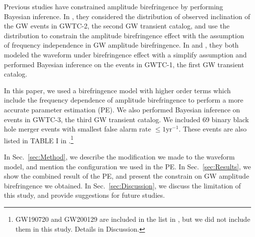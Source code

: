 \documentclass[aps,prd,twocolumn,superscriptaddress,preprintnumbers,floatfix,nofootinbib]{revtex4-2}
\begin{document}
Previous studies have constrained amplitude birefringence by performing Bayesian inference.
In \citet{Okounkova_2022}, they considered the distribution of observed inclination of the GW events in GWTC-2, the second GW transient catalog, and use the distribution to constrain the amplitude birefringence effect with the assumption of frequency independence in GW amplitude birefringence.
In \citet{Yamada_2020} and \citet{Wang_2021}, they both modeled the waveform under birefringence effect with a simplify assumption and performed Bayesian inference on the events in GWTC-1, the first GW transient catalog.

In this paper, we used a birefringence model with higher order terms which include the frequency dependence of amplitude birefringence to perform a more accurate parameter estimation (PE).
We also performed Bayesian inference on events in GWTC-3, the third GW transient catalog.
We included 69 binary black hole merger events with smallest false alarm rate $\leq1\mathrm{yr^{-1}}$.
These events are also listed in TABLE I in \citet{GWTC_3_population}.\footnote{GW190720 and GW200129 are included in the list in \citet{GWTC_3_population}, but we did not include them in this study. Details in Discussion.}

In Sec.~\ref{sec:Method}, we describe the modification we made to the waveform model, and mention the configuration we used in the PE.
In Sec.~\ref{sec:Results}, we show the combined result of the PE, and present the constrain on GW amplitude birefringence we obtained.
In Sec.~\ref{sec:Discussion}, we discuss the limitation of this study, and provide suggestions for future studies.
\end{document}
